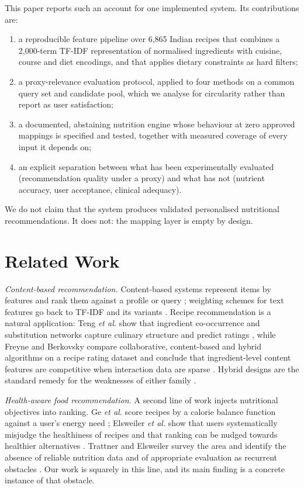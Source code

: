 \documentclass[conference]{IEEEtran}
\begin{document}
This paper reports such an account for one implemented system. Its contributions
are:
\begin{enumerate}
\item a reproducible feature pipeline over 6{,}865 Indian recipes that combines a
2{,}000-term TF-IDF representation of normalised ingredients with cuisine, course
and diet encodings, and that applies dietary constraints as hard filters;
\item a proxy-relevance evaluation protocol, applied to four methods on a common
query set and candidate pool, which we analyse for circularity rather than report
as user satisfaction;
\item a documented, abstaining nutrition engine whose behaviour at zero approved
mappings is specified and tested, together with measured coverage of every input
it depends on;
\item an explicit separation between what has been experimentally evaluated
(recommendation quality under a proxy) and what has not (nutrient accuracy, user
acceptance, clinical adequacy).
\end{enumerate}
We do not claim that the system produces validated personalised nutritional
recommendations. It does not: the mapping layer is empty by design.

\section{Related Work}
\label{sec:related}

\emph{Content-based recommendation.} Content-based systems represent items by
features and rank them against a profile or query \cite{pazzani2007}; weighting
schemes for text features go back to TF-IDF and its variants \cite{salton1988}.
Recipe recommendation is a natural application: Teng \emph{et al.} show that
ingredient co-occurrence and substitution networks capture culinary structure and
predict ratings \cite{teng2012}, while Freyne and Berkovsky compare collaborative,
content-based and hybrid algorithms on a recipe rating dataset and conclude that
ingredient-level content features are competitive when interaction data are sparse
\cite{freyne2010}. Hybrid designs are the standard remedy for the weaknesses of
either family \cite{burke2002}.

\emph{Health-aware food recommendation.} A second line of work injects nutritional
objectives into ranking. Ge \emph{et al.} score recipes by a calorie balance
function against a user's energy need \cite{ge2015}; Elsweiler \emph{et al.} show
that users systematically misjudge the healthiness of recipes and that ranking can
be nudged towards healthier alternatives \cite{elsweiler2017}. Trattner and
Elsweiler survey the area and identify the absence of reliable nutrition data and
of appropriate evaluation as recurrent obstacles \cite{trattner2017}. Our work is
squarely in this line, and its main finding is a concrete instance of that
obstacle.
\end{document}
